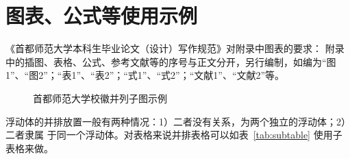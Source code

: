 \newpage
\section{图表、公式等使用示例}
《首都师范大学本科生毕业论文（设计）写作规范》对附录中图表的要求：
附录中的插图、表格、公式、参考文献等的序号与正文分开，另行编制，如编为“图1”、“图2”；“表1”、“表2”；“式1”、“式2”；“文献1”、“文献2”等。\par

\begin{figure}[!hbt]
\centering
{}
\caption{\label{f:s}首都师范大学校徽并列子图示例}
\end{figure}

浮动体的并排放置一般有两种情况：1）二者没有关系，为两个独立的浮动体；2）二者隶属
于同一个浮动体。对表格来说并排表格可以如表~\ref{tab:subtable} 使用子表格来做。

\begin{table}[htbp]
\centering
\caption{并排子表格}
\label{tab:subtable}
\hskip2cm
\end{table}

